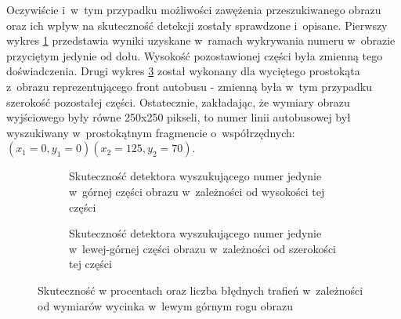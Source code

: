 Oczywiście i~w~tym przypadku możliwości zawężenia przeszukiwanego obrazu 
oraz ich wpływ na skuteczność detekcji zostały sprawdzone i~opisane.
Pierwszy wykres \ref{chart:verticalCut2ratio} przedstawia wyniki uzyskane w~ramach
wykrywania numeru w~obrazie przyciętym jedynie od dołu.
Wysokość pozostawionej części była zmienną tego doświadczenia.
Drugi wykres \ref{chart:horizontalCut2ratio} został wykonany dla wyciętego prostokąta
 z~obrazu reprezentującego
front autobusu - zmienną była w~tym przypadku szerokość pozostałej części.
Ostatecznie, zakładając, że wymiary obrazu wyjściowego były równe 250x250 pikseli,
to numer linii autobusowej był wyszukiwany w~prostokątnym fragmencie o~współrzędnych:
$ (x_1=0,y_1=0) (x_2=125,y_2=70) $.


\begin{figure}[h!]\centering
	\begin{subfigure}{.49\linewidth}\centering
		\caption{Skuteczność detektora wyszukującego numer jedynie w~górnej części
			obrazu w~zależności od wysokości tej części}
		\label{chart:verticalCut2ratio}
	\end{subfigure}	
	\hfill
	\begin{subfigure}{.49\linewidth}\centering
		\caption{Skuteczność detektora wyszukującego numer jedynie w~lewej-górnej części
			obrazu w~zależności od szerokości tej części}
		\label{chart:horizontalCut2ratio}
	\end{subfigure}
	\caption{Skuteczność w procentach oraz liczba błędnych trafień 
		w~zależności od wymiarów wycinka w~lewym górnym rogu obrazu}
\end{figure}

